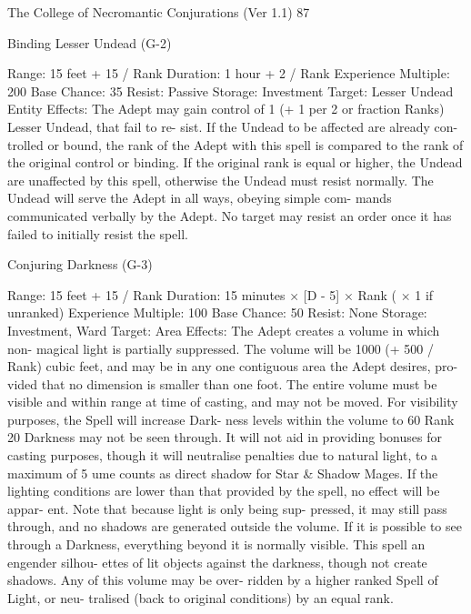 \begin{Chapter}{The College of Necromantic Conjurations (Ver 1.1)}
87 

Binding Lesser Undead (G-2) 

Range: 15 feet + 15 / Rank 
Duration: 1 hour + 2 / Rank 
Experience Multiple: 200 
Base Chance: 35%
Resist: Passive 
Storage: Investment 
Target: Lesser Undead Entity 
Effects: The Adept may gain control of 1 (+ 1 per 2 
or  fraction  Ranks)  Lesser  Undead,  that  fail  to  re-
sist.  If  the  Undead  to  be  affected  are  already  con-
trolled  or  bound,  the  rank  of  the  Adept  with  this 
spell is compared to the rank of the original control 
or  binding.  If  the  original  rank  is  equal  or  higher, 
the  Undead  are  unaffected by  this  spell,  otherwise 
the Undead must resist normally. The Undead will 
serve  the  Adept  in  all  ways,  obeying  simple  com-
mands  communicated  verbally  by  the  Adept.  No 
target  may  resist  an  order  once  it  has  failed  to 
initially resist the spell. 

Conjuring Darkness (G-3) 

Range: 15 feet + 15 / Rank 
Duration:  15  minutes  ×  [D  -  5]  ×  Rank  (  ×  1  if 
unranked) 
Experience Multiple: 100 
Base Chance: 50%
Resist: None 
Storage: Investment, Ward 
Target: Area 
Effects: The Adept creates a volume in which non-
magical  light  is  partially  suppressed.  The  volume 
will be 1000 (+ 500 / Rank) cubic feet, and may be 
in any one contiguous area the Adept desires, pro-
vided  that  no  dimension  is  smaller  than  one  foot. 
The entire volume must be visible and within range 
at  time  of  casting,  and  may  not  be  moved.  For 
visibility  purposes,  the  Spell  will  increase  Dark-
ness levels within the volume to 60%
Rank 20 Darkness may not be seen through. It will 
not  aid  in  providing  bonuses  for  casting  purposes, 
though  it  will  neutralise  penalties  due  to  natural 
light, to a maximum of 5%
ume  counts  as  direct  shadow  for  Star  \&  Shadow 
Mages.  If  the  lighting  conditions  are  lower  than 
that provided by the spell, no effect  will be appar-
ent.  Note  that  because  light  is  only  being  sup-
pressed, it may still pass through, and no shadows 
are generated outside the volume. If it is possible to 
see  through  a  Darkness,  everything  beyond  it  is 
normally  visible.  This  spell  an  engender  silhou-
ettes of lit objects against the darkness, though not 
create  shadows.  Any  of  this  volume  may  be  over-
ridden  by  a  higher  ranked  Spell  of  Light,  or  neu-
tralised  (back  to  original  conditions)  by  an  equal 
rank. 


\end{Chapter}
